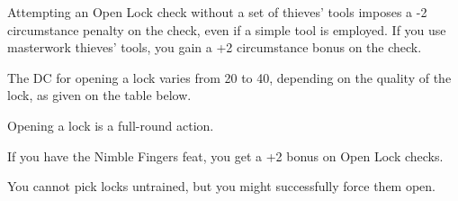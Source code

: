 Attempting an Open Lock check without a set of thieves’ tools imposes a -2 circumstance penalty on the check, even if a simple tool is employed. If you use masterwork thieves’ tools, you gain a +2 circumstance bonus on the check.

 The DC for opening a lock varies from 20 to 40, depending on the quality of the lock, as given on the table below.


 Opening a lock is a full-round action.

 If you have the Nimble Fingers feat, you get a +2 bonus on Open Lock checks.

 You cannot pick locks untrained, but you might successfully force them open.

